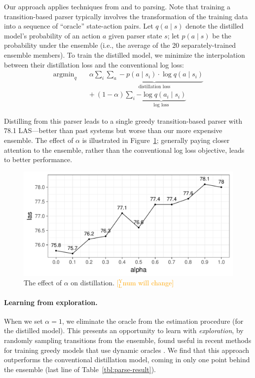 \documentclass[11pt,a4paper]{article}
\DeclareMathOperator*{\argmin}{argmin}
\newcommand{\yjcomment}[1]{\textcolor{orange}{[$_\mathrm{L}^\mathrm{Y}$#1]}}
\begin{document}
Our approach applies techniques from 
and  to parsing.
Note that training a transition-based parser typically involves the
transformation of the training data into a sequence of ``oracle'' state-action
pairs.
Let $q(a \mid s)$ denote the distilled model's
probability of an action $a$ given parser state $s$; let $p(a\mid s)$ be the probability under the
ensemble (i.e., the average of the 20 separately-trained ensemble
members).
To train the distilled model, we minimize the interpolation between
their distillation loss and the conventional log loss:
\begin{align}
{\argmin}_q \quad  & \alpha \sum_i \underbrace{\sum_{a} -p(a
	\mid s_i) \cdot \log q(a \mid s_i)}_{\text{distillation loss}} \\
& +\ (1 - \alpha) \sum_i \underbrace{- \log q(a_i \mid
  s_i)}_{\text{log loss}} \nonumber
\end{align}

Distilling from this 
parser leads to a single greedy transition-based parser with 78.1
LAS---better than past systems but worse than our more expensive ensemble.
The effect of $\alpha$ is illustrated in
Figure~\ref{fig:effect-alpha}; generally paying closer attention to
the ensemble, rather than the conventional log loss objective, leads
to better performance.

\begin{figure}[t]
	\centering
	\includegraphics[width=\columnwidth,trim={0.3cm 0 0 0},clip]{graphics/alpha}
	\caption{The effect of $\alpha$ on distillation. \yjcomment{num will change}\label{fig:effect-alpha}}
\end{figure}

\paragraph{Learning from exploration.} When we set $\alpha =1$, we
eliminate the oracle from the estimation procedure (for the distilled
model).  This presents an opportunity to learn with \emph{exploration}, by
randomly sampling transitions from the ensemble, found useful
in recent methods for training greedy models that use dynamic oracles
\citet{goldberg-nivre:2012:PAPERS,TACL145,TACL885,ballesteros-EtAl:2016:EMNLP2016}.  
We find that this
approach outperforms the  conventional distillation model, coming in
only one point behind the ensemble (last line of Table~\ref{tbl:parse-result}).
\end{document}
